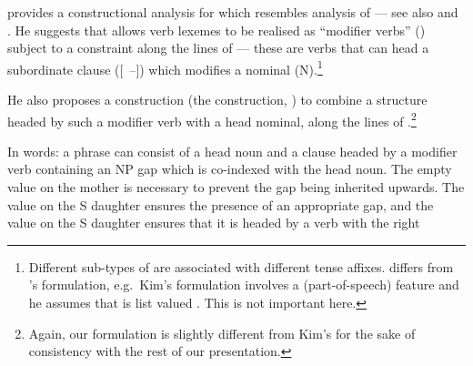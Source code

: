 \documentclass[output=paper
 	        ,biblatex
                ,babelshorthands
                ,newtxmath
                ,draftmode
                ,colorlinks, citecolor=brown
]{langscibook}
\begin{document}
\citet{Kim16SyntacticStrKorean} provides a constructional analysis for  which
resembles  analysis of  --- see also  and
. He suggests that  allows verb lexemes
to be realised as ``modifier verbs'' () subject to a constraint along the
lines of  --- these are verbs that can head a subordinate clause ([~{--}])
which modifies a nominal (N).\footnote{Different sub-types of  are associated
  with different tense affixes.  differs from
  \citeauthor{Kim16SyntacticStrKorean}'s formulation, e.g.\ Kim's formulation involves a
   (part-of-speech) feature and he assumes that  is list valued
  \citep[see][285]{Kim16SyntacticStrKorean}. This is not important here.}
\begin{exe}\ex\label{x:rc-86}
\end{exe}
He   also   proposes   a  construction   (the     construction,
\citealt[see][290]{Kim16SyntacticStrKorean})  to  combine a  structure  headed  by such  a
modifier verb  with a head  nominal, along  the lines of  .\footnote{Again, our
  formulation is slightly different from Kim's for  the sake of consistency with the rest of
  our presentation. }
\begin{exe}\ex\label{x:rc-87}
\end{exe}
In words: a phrase can consist of a head noun and a clause headed by a
modifier verb containing an NP gap which is co-indexed with the head noun. The empty
 value on the mother is necessary to prevent the gap being inherited
upwards. The  value on the S daughter ensures the presence of an appropriate gap, and the
 value on the S daughter ensures that it is headed by a verb with the right
\end{document}
